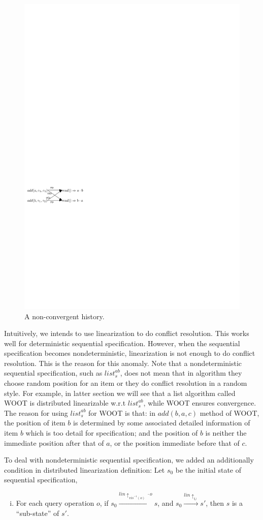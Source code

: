 {\begin{figure}[t]
  \centering
  \includegraphics[width=0.4 \textwidth]{figures/PIC-His-list-NonConvergent.pdf}
  \caption{A non-convergent history.}
  \label{fig:a non-convergent history}
\end{figure}



Intuitively, we intends to use linearization to do conflict resolution. This works well for deterministic sequential specification. However, when the sequential specification becomes nondeterministic, linearization is not enough to do conflict resolution. This is the reason for this anomaly. Note that a nondeterministic sequential specification, such as $\mathit{list}_s^{\mathit{ab}}$, does not mean that in algorithm they choose random position for an item or they do conflict resolution in a random style. For example, in latter section we will see that a list algorithm called WOOT is distributed linearizable w.r.t $\mathit{list}_s^{\mathit{ab}}$, while WOOT ensures convergence. The reason for using $\mathit{list}_s^{\mathit{ab}}$ for WOOT is that: in $\mathit{add}(b,a,c)$ method of WOOT, the position of item $b$ is determined by some associated detailed information of item $b$ which is too detail for specification; and the position of $b$ is neither the immediate position after that of $a$, or the position immediate before that of $c$.

To deal with nondeterministic sequential specification, we added an additionally condition in distributed linearization definition: Let $s_0$ be the initial state of sequential specification,

\begin{enumerate}[(i)]
\item For each query operation $o$, if $s_0 {\xrightarrow{ \mathit{lin} \uparrow_{ \mathit{vis}^{-1}(o)  } \cdot o }} s$, and $s_0 {\xrightarrow{ \mathit{lin} \uparrow_{ \mathbb{U} } } } s'$, then $s$ is a ``sub-state'' of $s'$.
\end{enumerate}

}
